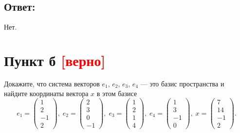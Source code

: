 \documentclass[12pt]{article}
\begin{document}
    \subsection*{Ответ:}
    Нет.

    \section*{Пункт б \textcolor{red}{[верно]}}
    Докажите, что система векторов $e_1$, $e_2$, $e_3$, $e_4$ --- это базис пространства и найдите координаты вектора $x$ в этом базисе
    \[
        e_1 =
        \begin{pmatrix}
            1 \\ 2 \\ -1 \\ 2
        \end{pmatrix}, \;
        e_2 =
        \begin{pmatrix}
            2 \\ 3 \\ 0 \\ -1
        \end{pmatrix}, \;
        e_3 =
        \begin{pmatrix}
            1 \\ 2 \\ 1 \\ 4
        \end{pmatrix}, \;
        e_4 =
        \begin{pmatrix}
            1 \\ 3 \\ -1 \\ 0
        \end{pmatrix}, \;
        x =
        \begin{pmatrix}
            7 \\ 14 \\ -1 \\ 2
        \end{pmatrix} .
    \]
\end{document}
